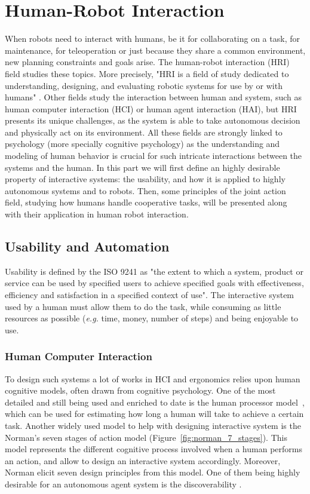 \documentclass[a4paper,11pt,twoside]{StyleThese}
\begin{document}
\section{Human-Robot Interaction}
When robots need to interact with humans, be it for collaborating on a task, for maintenance, for teleoperation or just because they share a common environment, new planning constraints and goals arise. The human-robot interaction (HRI) field studies these topics. More precisely, "HRI is a field of study dedicated to understanding, designing, and evaluating robotic systems for use by or with humans" \cite{goodrich_human-robot_2007}. Other fields study the interaction between human and system, such as human computer interaction (HCI) or human agent interaction (HAI), but HRI presents its unique challenges, as the system is able to take autonomous decision and physically act on its environment.
All these fields are strongly linked to psychology (more specially cognitive psychology) as the understanding and modeling of human behavior is crucial for such intricate interactions between the systems and the human.
In this part we will first define an highly desirable property of interactive systems: the usability, and how it is applied to highly autonomous systems and to robots. Then, some principles of the joint action field, studying how humans handle cooperative tasks, will be presented along with their application in human robot interaction.

\subsection{Usability and Automation}
Usability is defined by the ISO 9241 as "the extent to which a system, product or service can be used by specified users to achieve specified goals with effectiveness, efficiency and satisfaction in a specified context of use". The interactive system used by a human must allow them to do the task, while consuming as little resources as possible (\textit{e.g.} time, money, number of steps) and being enjoyable to use.

\subsubsection{Human Computer Interaction}

To design such systems a lot of works in HCI and ergonomics relies upon human cognitive models, often drawn from cognitive psychology. One of the most detailed and still being used and enriched to date is the human processor model~\cite{card1983psychology}, which can be used for estimating how long a human will take to achieve a certain task. Another widely used model to help with designing interactive system is the Norman's seven stages of action model (Figure~\ref{fig:norman_7_stages}). This model represents the different cognitive process involved when a human performs an action, and allow to design an interactive system accordingly. Moreover, Norman elicit seven design principles from this model. One of them being highly desirable for an autonomous agent system is the discoverability \cite{norman2013design}.
\end{document}
